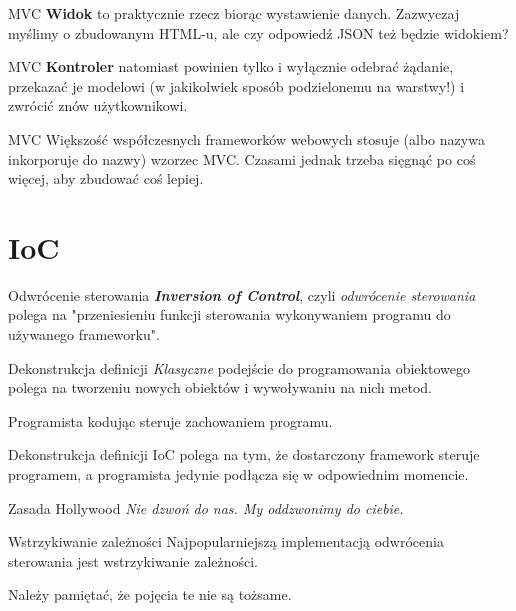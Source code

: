\begin{frame}{MVC}
	\textbf{Widok} to praktycznie rzecz biorąc wystawienie danych. Zazwyczaj myślimy o zbudowanym HTML-u, ale czy odpowiedź JSON też będzie widokiem?
\end{frame}

\begin{frame}{MVC}
	\textbf{Kontroler} natomiast powinien tylko i wyłącznie odebrać żądanie, przekazać je modelowi (w jakikolwiek sposób podzielonemu na warstwy!) i zwrócić znów użytkownikowi.
\end{frame}

\begin{frame}{MVC}
	Większość współczesnych frameworków webowych stosuje (albo nazywa inkorporuje do nazwy) wzorzec MVC. Czasami jednak trzeba sięgnąć po coś więcej, aby zbudować coś lepiej.
\end{frame}

\section{IoC}

\begin{frame}{Odwrócenie sterowania}
	\textbf{\emph{Inversion of Control}}, czyli \emph{odwrócenie sterowania} polega na "przeniesieniu funkcji sterowania wykonywaniem programu do używanego frameworku".
\end{frame}

\begin{frame}{Dekonstrukcja definicji}
	\emph{Klasyczne} podejście do programowania obiektowego polega na tworzeniu nowych obiektów i wywoływaniu na nich metod.
	
	Programista kodując steruje zachowaniem programu.
\end{frame}

\begin{frame}{Dekonstrukcja definicji}
	IoC polega na tym, że dostarczony framework steruje programem, a programista jedynie podłącza się w odpowiednim momencie.
\end{frame}

\begin{frame}{Zasada Hollywood}
	\emph{Nie dzwoń do nas. My oddzwonimy do ciebie.}
\end{frame}

\begin{frame}{Wstrzykiwanie zależności}
	Najpopularniejszą implementacją odwrócenia sterowania jest wstrzykiwanie zależności. 
	
	Należy pamiętać, że pojęcia te nie są tożsame.
\end{frame}

